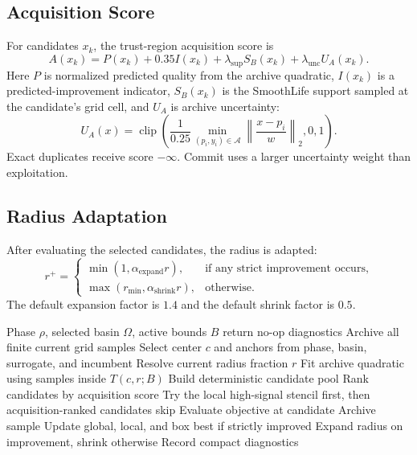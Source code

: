\documentclass[11pt]{article}
\newcommand{\clip}{\operatorname{clip}}
\begin{document}
\subsection{Acquisition Score}

For candidates $x_k$, the trust-region acquisition score is
\begin{equation}
A(x_k)
= P(x_k) + 0.35 I(x_k)
+\lambda_{\mathrm{sup}} S_B(x_k)
+\lambda_{\mathrm{unc}} U_A(x_k).
\label{eq:acquisition}
\end{equation}
Here $P$ is normalized predicted quality from the archive quadratic,
$I(x_k)$ is a predicted-improvement indicator, $S_B(x_k)$ is the SmoothLife
support sampled at the candidate's grid cell, and $U_A$ is archive uncertainty:
\begin{equation}
U_A(x)
= \clip\left(
\frac{1}{0.25}
\min_{(p_i,y_i)\in\mathcal{A}}
\left\|
\frac{x-p_i}{w}
\right\|_2,
0,1
\right).
\label{eq:archive-uncertainty}
\end{equation}
Exact duplicates receive score $-\infty$. Commit uses a larger uncertainty
weight than exploitation.

\subsection{Radius Adaptation}

After evaluating the selected candidates, the radius is adapted:
\begin{equation}
r^+ =
\begin{cases}
\min(1,\alpha_{\mathrm{expand}}r), & \text{if any strict improvement occurs},\\
\max(r_{\min},\alpha_{\mathrm{shrink}}r), & \text{otherwise}.
\end{cases}
\label{eq:radius-update}
\end{equation}
The default expansion factor is $1.4$ and the default shrink factor is $0.5$.

\begin{algorithm}
\caption{Trust-region acquisition batch}
\begin{algorithmic}[1]
\Require Phase $\rho$, selected basin $\Omega$, active bounds $B$
    \State return no-op diagnostics
\EndIf
\State Archive all finite current grid samples
\State Select center $c$ and anchors from phase, basin, surrogate, and incumbent
\State Resolve current radius fraction $r$
\State Fit archive quadratic using samples inside $T(c,r;B)$
\State Build deterministic candidate pool
\State Rank candidates by acquisition score
    \State Try the local high-signal stencil first, then acquisition-ranked candidates
\EndIf
{}
        \State skip
    \EndIf
    \State Evaluate objective at candidate
    \State Archive sample
    \State Update global, local, and box best if strictly improved
\EndFor
\State Expand radius on improvement, shrink otherwise
\State Record compact diagnostics
\end{algorithmic}
\label{alg:trust-region}
\end{algorithm}
\end{document}
